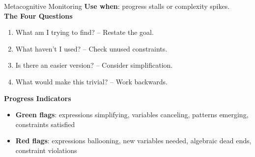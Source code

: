 \documentclass{article}
\begin{document}
    \begin{trainingbox}{Metacognitive Monitoring}
    \textbf{Use when}: progress stalls or complexity spikes.\\
    \textbf{The Four Questions}\\
    \begin{enumerate}[nosep]
        \item What am I trying to find? -- Restate the goal.
        \item What haven't I used? -- Check unused constraints.
        \item Is there an easier version? -- Consider simplification.
        \item What would make this trivial? -- Work backwards.
    \end{enumerate}
    \textbf{Progress Indicators}\\
    \begin{itemize}[nosep]
        \item \textbf{Green flags}: expressions simplifying, variables canceling, patterns emerging, constraints satisfied
        \item \textbf{Red flags}: expressions ballooning, new variables needed, algebraic dead ends, constraint violations
    \end{itemize}
\end{trainingbox}
    
\end{document}
